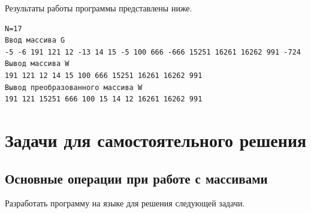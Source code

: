 Результаты работы программы представлены ниже.
\begin{verbatim}
N=17 
Ввод массива G 
-5 -6 191 121 12 -13 14 15 -5 100 666 -666 15251 16261 16262 991 -724 
Вывод массива W 
191 121 12 14 15 100 666 15251 16261 16262 991 
Вывод преобразованного массива W 
191 121 15251 666 100 15 14 12 16261 16262 991
\end{verbatim}

\section[Задачи для самостоятельного решения]{Задачи для самостоятельного решения}
\subsection[Основные операции при работе с массивами]{Основные операции при работе с массивами}
Разработать программу на языке  для решения следующей задачи.

